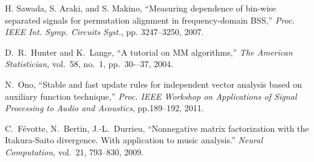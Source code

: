 \documentclass[10.5pt]{jarticle}
\begin{document}
\begin{thebibliography}{99}
H. Sawada, S. Araki, and S. Makino, ``Measuring dependence of bin-wise separated signals for permutation alignment in frequency-domain BSS,'' {\em Proc. IEEE Int. Symp. Circuits Syst.}, pp. 3247–3250, 2007.

D.~R.~Hunter and K.~Lange, ``A tutorial on MM algorithms,'' 
{\em The American Statistician,} vol.~58, no.~1, pp.~30-–37, 2004.

N.~Ono,
``Stable and fast update rules for independent vector analysis based on auxiliary function technique,''
{\em Proc. IEEE Workshop on Applications of Signal Processing to Audio and Acoustics}, pp.189--192, 2011.

C.~Févotte, N.~Bertin, J.-L.~Durrieu, 
``Nonnegative matrix factorization with the Itakura-Saito divergence. With application to music analysis.'' 
{\em Neural Computation}, vol.~21, 793--830, 2009.



\end{thebibliography}
\end{document}
